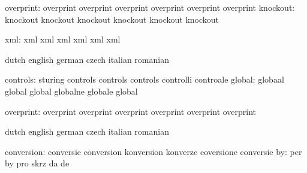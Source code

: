                 overprint: overprint                 overprint
                           overprint                 overprint
                           overprint                 overprint %
                 knockout: knockout                  knockout
                           knockout                  knockout
                           knockout                  knockout %

                      xml: xml                       xml
                           xml                       xml
                           xml                       xml

\stopvariables

\startconstants            dutch                     english
                           german                    czech
                           italian                   romanian

                 controls: sturing                   controls
                           controls                  controls
                           controlli                 controale
                   global: globaal                   global
                           global                    globalne
                           globale                   global

                overprint: overprint                 overprint
                           overprint                 overprint
                           overprint                 overprint %

\stopconstants





\startvariables            dutch                     english
                           german                    czech
                           italian                   romanian

               conversion: conversie                 conversion
                           konversion                konverze
                           coversione                conversie
                       by: per                       by
                           pro                       skrz
                           da                        de

\stopvariables

